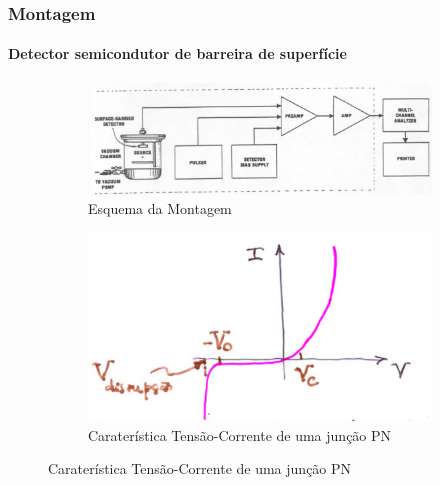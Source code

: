 \documentclass[10pt]{beamer}
\begin{document}
\begin{frame}
\frametitle{Montagem}
\framesubtitle{Detector semicondutor de barreira de superfície}

\begin{figure}
\centering
\begin{subfigure}{.5\textwidth}
  \centering
  \includegraphics[scale=0.23]{MONT.png}
\caption{Esquema da Montagem}
  \label{fig:sub1}
\end{subfigure}%
\begin{subfigure}{.5\textwidth}
  \centering
  \includegraphics[scale=0.3]{juncpn.png}
\caption{Caraterística Tensão-Corrente de uma junção PN}
  \label{fig:sub2}
\end{subfigure}
\label{fig:test}
\end{figure}

\end{frame}
\end{document}
